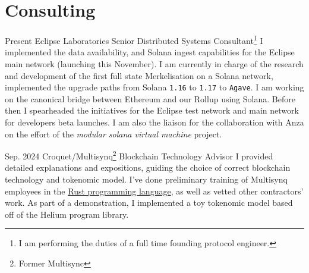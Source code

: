 \documentclass{CurriculumVitae}[10pt, condensed]
\author{Aleksandr Petrosyan}
\date{\today}
\begin{document}
\maketitle

\vfill
\section*{Consulting}
%
    {Present}%
    {Eclipse Laboratories}%
    {Senior Distributed Systems Consultant\footnote{I am performing
        the duties of a full time founding protocol engineer. }}%
    {%
      I implemented the data availability, and Solana ingest
      capabilities for the Eclipse main network (launching this
      November).  I am currently in charge of the research and
      development of the first full state Merkelisation on a Solana
      network, implemented the upgrade paths from Solana \texttt{1.16}
      to \texttt{1.17} to \texttt{Agave}.  I am working on the
      canonical bridge between Ethereum and our Rollup using Solana.
      Before then I spearheaded the initiatives for the Eclipse test
      network and main network for developers beta launches.  I am
      also the liaison for the collaboration with Anza on the effort
      of the \emph{modular solana virtual machine} project.
    }%

%
    {Sep. 2024}%
    {Croquet/Multisynq\footnote{Former Multisync}}%
    {Blockchain Technology Advisor}%
    {%
      I provided detailed explanations and expositions, guiding the
      choice of correct blockchain technology and tokenomic model.  I've
      done preliminary training of Multisynq employees in the
      \href{https://github.com/Greybeard-Entertainment/rust}{Rust
        programming language}, as well as vetted other contractors' work.  As
      part of a demonstration, I implemented a toy tokenomic model based off
      of the Helium program library.
    }%


\vfill
\end{document}
